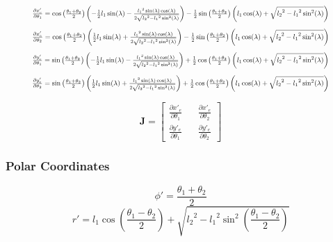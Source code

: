\documentclass[11pt, titlepage]{article}
\begin{document}
\begin{equation}
\resizebox{.9 \textwidth}{!} 
{
$\frac{\partial x'_e}{\partial \theta_1} = \cos\left(\frac{\theta_1+\theta_2}{2}\right)\left(-\frac{1}{2}l_1\sin(\lambda)-\frac{{l_1}^2\sin(\lambda)\cos(\lambda)}{2\sqrt{{l_2}^2-{l_1}^2\sin^2(\lambda)}}\right)
- \frac{1}{2}\sin\left(\frac{\theta_1+\theta_2}{2}\right)\left(l_1\cos(\lambda)+\sqrt{{l_2}^2-{l_1}^2\sin^2(\lambda)}\right)$
}
\end{equation}
\begin{equation}
\resizebox{.9 \textwidth}{!} 
{
$\frac{\partial x'_e}{\partial \theta_2} = \cos\left(\frac{\theta_1+\theta_2}{2}\right)\left(\frac{1}{2}l_1\sin(\lambda)+\frac{{l_1}^2\sin(\lambda)\cos(\lambda)}{2\sqrt{{l_2}^2-{l_1}^2\sin^2(\lambda)}}\right)
- \frac{1}{2}\sin\left(\frac{\theta_1+\theta_2}{2}\right)\left(l_1\cos(\lambda)+\sqrt{{l_2}^2-{l_1}^2\sin^2(\lambda)}\right)$
}
\end{equation}
\begin{equation}
\resizebox{.9 \textwidth}{!} 
{
$\frac{\partial y'_e}{\partial \theta_1} = \sin\left(\frac{\theta_1+\theta_2}{2}\right)\left(-\frac{1}{2}l_1\sin(\lambda)-\frac{{l_1}^2\sin(\lambda)\cos(\lambda)}{2\sqrt{{l_2}^2-{l_1}^2\sin^2(\lambda)}}\right)
+ \frac{1}{2}\cos\left(\frac{\theta_1+\theta_2}{2}\right)\left(l_1\cos(\lambda)+\sqrt{{l_2}^2-{l_1}^2\sin^2(\lambda)}\right)$
}
\end{equation}
\begin{equation}
\resizebox{.9 \textwidth}{!} 
{
$\frac{\partial y'_e}{\partial \theta_2} = \sin\left(\frac{\theta_1+\theta_2}{2}\right)\left(\frac{1}{2}l_1\sin(\lambda)+\frac{{l_1}^2\sin(\lambda)\cos(\lambda)}{2\sqrt{{l_2}^2-{l_1}^2\sin^2(\lambda)}}\right)
+ \frac{1}{2}\cos\left(\frac{\theta_1+\theta_2}{2}\right)\left(l_1\cos(\lambda)+\sqrt{{l_2}^2-{l_1}^2\sin^2(\lambda)}\right)$
}
\end{equation}

$$
	\textbf{J} = 
\begin{bmatrix}
\frac{\partial x'_e}{\partial \theta_1} &&
\frac{\partial x'_e}{\partial \theta_2} \\
\frac{\partial y'_e}{\partial \theta_1} &&
\frac{\partial y'_e}{\partial \theta_2}
\end{bmatrix}
$$

\subsubsection{Polar Coordinates}
\begin{equation}
	\phi' = \frac{\theta_1 + \theta_2}{2}
\end{equation}
\begin{equation}
	r' = l_1\cos(\frac{\theta_1 - \theta_2}{2})+\sqrt{{l_2}^2-{l_1}^2\sin^2(\frac{\theta_1 - \theta_2}{2})}
\end{equation}
\end{document}
